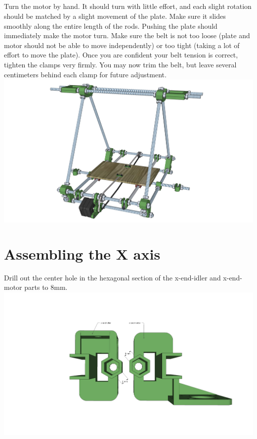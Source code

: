 \documentclass[twoside,a4paper,titlepage]{memoir}
\begin{document}
	\section{}
	Turn the motor by hand. It should turn with little effort, and each slight rotation should be matched by a
	slight movement of the plate. Make sure it slides smoothly along the entire length of the rods. Pushing
	the plate should immediately make the motor turn. Make sure the belt is not too loose (plate and motor
	should not be able to move independently) or too tight (taking a lot of effort to move the plate). Once
	you are confident your belt tension is correct, tighten the clamps very firmly. You may now trim the belt,
	but leave several centimeters behind each clamp for future adjustment.\\
	\includegraphics[width=1\linewidth]{graphics/ch6_29.png}
	
	\chapter{Assembling the X axis}
	Drill out the center hole in the hexagonal section of the x-end-idler and x-end-motor parts to 8mm.\\
	\includegraphics[width=1\linewidth]{graphics/ch7_1.png}
	
\end{document}
